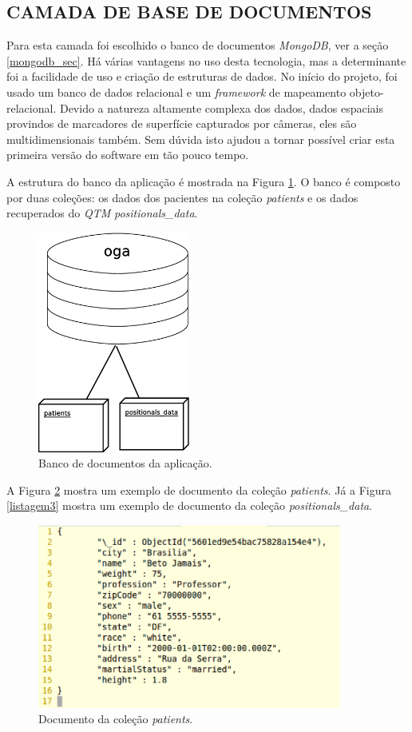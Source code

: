 \subsection {CAMADA DE BASE DE DOCUMENTOS}

Para esta camada foi escolhido o banco de documentos \emph{MongoDB}, ver a seção \ref{mongodb_sec}. 
Há várias vantagens no uso desta tecnologia, mas a determinante foi a facilidade de uso e criação de estruturas de dados. 
No início do projeto, foi usado um banco de dados relacional e um \emph{framework} de mapeamento objeto-relacional. 
Devido a natureza altamente complexa dos dados, dados espaciais provindos de marcadores de superfície capturados por câmeras, eles são multidimensionais também. 
Sem dúvida isto ajudou a tornar possível criar esta primeira versão do software em tão pouco tempo.

A estrutura do banco da aplicação é mostrada na Figura \ref{mongo_oga}. 
O banco é composto por duas coleções: os dados dos pacientes na coleção \emph{patients} e os dados recuperados do \emph{QTM} \emph{positionals\_data}.

\begin{figure}[H]
	\centering
	\includegraphics[width=5cm]{figuras/mongo_oga.eps}
	\caption{Banco de documentos da aplicação.}
	\label{mongo_oga}
\end{figure}

A Figura \ref{listagem2}  mostra um exemplo de documento da coleção \emph{patients}.
Já a Figura \ref{listagem3}  mostra um exemplo de documento da coleção \emph{positionals\_data}.

\begin{figure}[H]
	\centering
	\includegraphics[width=10cm]{figuras/listagem2.eps}
	\caption{Documento da coleção \emph{patients}.}
	\label{listagem2}
\end{figure}

